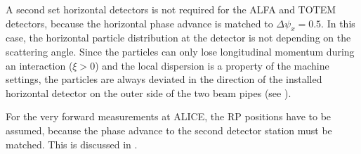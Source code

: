 A second set horizontal detectors is not required for the ALFA and TOTEM detectors, because the horizontal phase advance is matched to $\Delta \psi_x = 0.5$. In this case, the horizontal particle distribution at the detector is not depending on the scattering angle. Since the particles can only lose longitudinal momentum during an interaction ($\xi >0$) and the local dispersion is a property of the machine settings, the particles are always deviated in the direction of the installed horizontal detector on the outer side of the two beam pipes (see ). 

For the very forward measurements at ALICE, the RP positions have to be assumed, because the phase advance to the second detector station must be matched. This is discussed in .

% 


%
